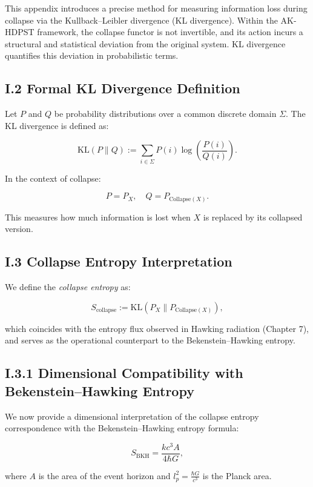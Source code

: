 \documentclass[11pt]{article}
\begin{document}
This appendix introduces a precise method for measuring information loss during collapse via the Kullback–Leibler divergence (KL divergence). Within the AK-HDPST framework, the collapse functor is not invertible, and its action incurs a structural and statistical deviation from the original system. KL divergence quantifies this deviation in probabilistic terms.

\subsection*{I.2 Formal KL Divergence Definition}

Let \( P \) and \( Q \) be probability distributions over a common discrete domain \( \Sigma \). The KL divergence is defined as:

\[
\mathrm{KL}(P \parallel Q) := \sum_{i \in \Sigma} P(i) \log \left( \frac{P(i)}{Q(i)} \right).
\]

In the context of collapse:

\[
P = P_X, \quad Q = P_{\mathrm{Collapse}(X)}.
\]

This measures how much information is lost when \( X \) is replaced by its collapsed version.

\subsection*{I.3 Collapse Entropy Interpretation}

We define the \emph{collapse entropy} as:

\[
S_{\mathrm{collapse}} := \mathrm{KL}(P_X \parallel P_{\mathrm{Collapse}(X)}),
\]

which coincides with the entropy flux observed in Hawking radiation (Chapter 7), and serves as the operational counterpart to the Bekenstein–Hawking entropy.

\subsection*{I.3.1 Dimensional Compatibility with Bekenstein–Hawking Entropy}

We now provide a dimensional interpretation of the collapse entropy correspondence with the Bekenstein–Hawking entropy formula:

\[
S_{\mathrm{BKH}} = \frac{k c^3 A}{4 \hbar G},
\]

where \( A \) is the area of the event horizon and \( l_p^2 = \frac{\hbar G}{c^3} \) is the Planck area.
\end{document}
